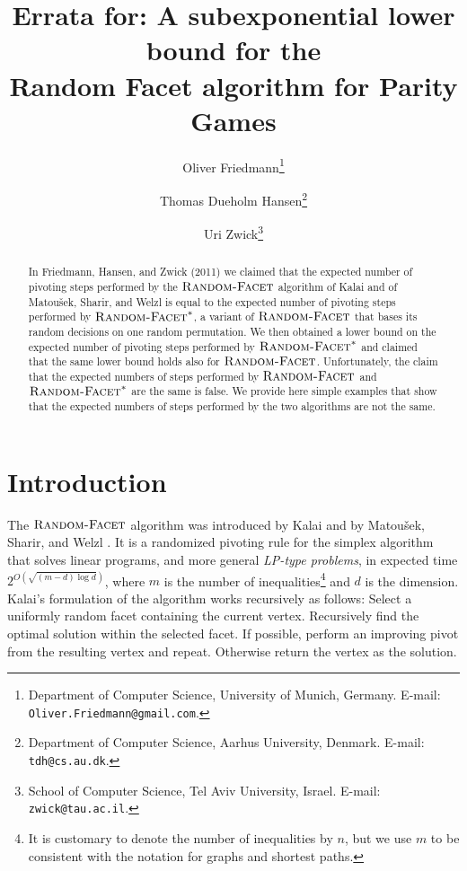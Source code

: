 \documentclass[twoside,11pt]{article}
\newcommand{\RandomFacet}{\mbox{\sc Random-}\allowbreak\mbox{\sc Facet}}
\begin{document}
\title{\textbf{Errata for:} A subexponential lower bound for the \\Random Facet algorithm for Parity Games}

\author{Oliver Friedmann\thanks{Department of Computer Science,
University of Munich, Germany. E-mail: {\tt
  Oliver.Friedmann@gmail.com}.}\\
 \and
Thomas Dueholm Hansen\thanks{Department of Computer Science,
Aarhus University, Denmark. E-mail:
{\tt tdh@cs.au.dk}.}\\
\and
Uri Zwick\thanks{School of Computer Science, Tel Aviv University,
  Israel. E-mail: {\tt zwick@tau.ac.il}.} }
\date{}

\maketitle

\begin{abstract}\noindent In Friedmann, Hansen, and Zwick (2011) we claimed that the expected number of pivoting steps performed by the $\RandomFacet$ algorithm of Kalai and of Matou{\v{s}}ek, Sharir, and Welzl is equal to the expected number of pivoting steps performed by $\RandomFacet^*$, a variant of $\RandomFacet$ that bases its random decisions on one random permutation. We then obtained a lower bound on the expected number of pivoting steps performed by $\RandomFacet^*$ and claimed that the same lower bound holds also for $\RandomFacet$.
Unfortunately, the claim that the expected numbers of steps performed by $\RandomFacet$ and $\RandomFacet^*$ are the same is false. We provide here simple examples that show that the expected numbers of steps performed by the two algorithms are not the same.
\end{abstract}

\section{Introduction}

The $\RandomFacet$ algorithm was introduced by Kalai \cite{Kalai92,Kalai97} and by Matou{\v{s}}ek, Sharir, and Welzl \cite{MaShWe96}. It is a randomized pivoting rule for the simplex algorithm that solves linear programs, and more general \emph{LP-type problems}, in expected time $2^{O(\sqrt{(m-d)\log d})}$, where $m$ is the number of inequalities\footnote{It is customary to denote the number of inequalities by $n$, but we use $m$ to be consistent with the notation for graphs and shortest paths.} and $d$ is the dimension. Kalai's formulation of the algorithm works recursively as follows: Select a uniformly random facet containing the current vertex. Recursively find the optimal solution within the selected facet. If possible, perform an improving pivot from the resulting vertex and repeat. Otherwise return the vertex as the solution.
\end{document}
